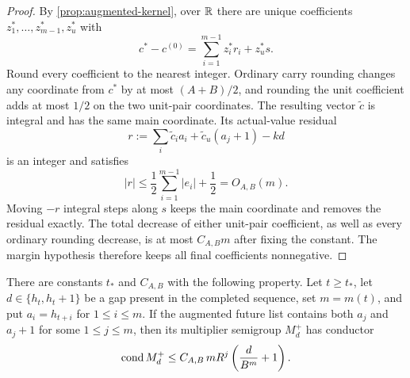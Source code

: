 \begin{proof}
  By \cref{prop:augmented-kernel}, over $\mathbb{R}$ there are unique coefficients
  $z_1^*,\ldots,z_{m-1}^*,z_u^*$ with
  \[
    c^*-c^{(0)}=\sum_{i=1}^{m-1}z_i^*r_i+z_u^*s.
  \]
  Round every coefficient to the nearest integer.  Ordinary carry rounding
  changes any coordinate from $c^*$ by at most $(A+B)/2$, and rounding the
  unit coefficient adds at most $1/2$ on the two unit-pair coordinates.  The
  resulting vector $\widetilde c$ is integral and has the same main
  coordinate.  Its actual-value residual
  \[
    r:=\sum_i\widetilde c_i a_i+\widetilde c_u(a_j+1)-kd
  \]
  is an integer and satisfies
  \[
    |r|\le\frac12\sum_{i=1}^{m-1}|e_i|+\frac12
         =O_{A,B}(m).
  \]
  Moving $-r$ integral steps along $s$ keeps the main coordinate and removes
  the residual exactly.  The total decrease of either unit-pair coefficient,
  as well as every ordinary rounding decrease, is at most $C_{A,B}m$ after
  fixing the constant.  The margin hypothesis therefore keeps all final
  coefficients nonnegative.
\end{proof}

\begin{theorem}
  \label{thm:conductor}
  There are constants $t_*$ and $C_{A,B}$ with the following property.  Let
  $t\ge t_*$, let $d\in\{h_t,h_t+1\}$ be a gap present in the completed
  sequence, set $m=m(t)$, and put $a_i=h_{t+i}$ for $1\le i\le m$.  If the
  augmented future list contains both $a_j$ and $a_j+1$ for some
  $1\le j\le m$, then its multiplier semigroup $M_d^+$ has conductor
  \begin{equation}
    \operatorname{cond} M_d^+
    \le C_{A,B}\,mR^j\left(\frac d{B^m}+1\right).
    \label{eq:conductor-bound}
  \end{equation}
\end{theorem}

